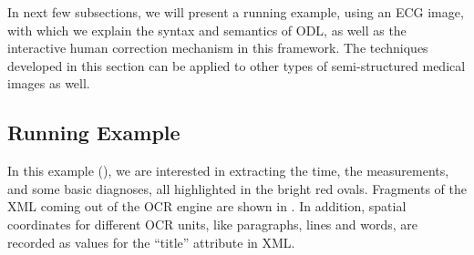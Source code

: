 



In next few subsections, we will present a running example, using
an ECG image, with
which we explain the syntax and semantics of ODL, 
as well as the interactive human correction mechanism in this framework.
The techniques developed in this section can be applied to 
other types of semi-structured medical images as well.

\subsection{Running Example}
In this example (), 
we are interested in extracting the time, the measurements, 
and some basic diagnoses, all highlighted in the bright red ovals.
Fragments of the XML coming out of the OCR engine are shown 
in . In addition, spatial coordinates for different 
OCR units, like paragraphs, lines and words, are recorded as values  
for the ``title'' attribute in XML. 

